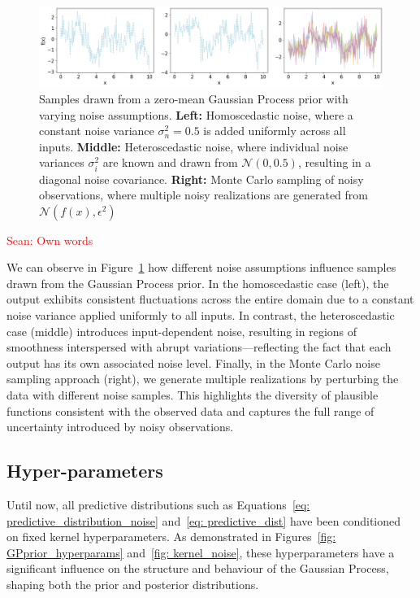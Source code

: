 \documentclass{article}
\newcommand{\Sean}[1]{{\textcolor{red}{{Sean: #1}} }}
\begin{document}
\begin{figure}[H]
    \centering
    \includegraphics[width=\textwidth]{LatexPlots/1dplots/GPR_noise_comparison.png}
    \caption{Samples drawn from a zero-mean Gaussian Process prior with varying noise assumptions.
    \textbf{Left:} Homoscedastic noise, where a constant noise variance \(\sigma_n^2 = 0.5\) is added uniformly across all inputs.
    \textbf{Middle:} Heteroscedastic noise, where individual noise variances \(\sigma_i^2\) are known and drawn from \(\mathcal{N}(0, 0.5)\), resulting in a diagonal noise covariance.
    \textbf{Right:} Monte Carlo sampling of noisy observations, where multiple noisy realizations are generated from \(\mathcal{N}(f(x), \epsilon^2)\)}
    \label{fig:noise_comparison}
\end{figure}

\Sean{Own words}

\noindent
We can observe in Figure~\ref{fig:noise_comparison} how different noise assumptions influence samples drawn from the Gaussian Process prior. 
In the homoscedastic case (left), the output exhibits consistent fluctuations across the entire domain due to a constant noise variance applied uniformly to all inputs. 
In contrast, the heteroscedastic case (middle) introduces input-dependent noise, resulting in regions of smoothness interspersed with abrupt variations—reflecting the fact that each output has its own associated noise level.
Finally, in the Monte Carlo noise sampling approach (right), we generate multiple realizations by perturbing the data with different noise samples. This highlights the diversity of plausible functions consistent with the observed data and captures the full range of uncertainty introduced by noisy observations.
 



\subsection{Hyper-parameters}
\label{sec: Hyper_parameters}

\noindent
Until now, all predictive distributions such as Equations~\ref{eq: predictive_distribution_noise} and~\ref{eq: predictive_dist} have been conditioned on fixed kernel hyperparameters. As demonstrated in Figures~\ref{fig: GPprior_hyperparams} and~\ref{fig: kernel_noise}, these hyperparameters have a significant influence on the structure and behaviour of the Gaussian Process, shaping both the prior and posterior distributions. 
\end{document}
